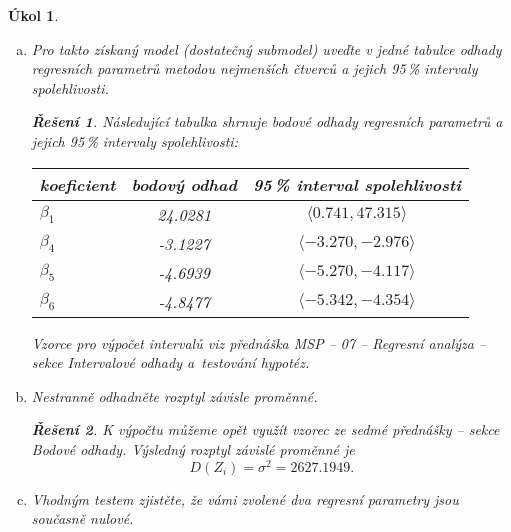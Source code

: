 \documentclass[11pt, a4paper]{article}
\theoremstyle{result}
\newtheorem*{result}{Řešení}
\newtheorem{task}{Úkol}
\begin{document}
\begin{task}
\begin{enumerate}[a)]
        \item Pro takto získaný model (dostatečný submodel) uveďte v jedné tabulce odhady regresních parametrů metodou nejmen\-ších čtverců a jejich 95\,\% intervaly spolehlivosti.

        \begin{result}
            Následující tabulka shrnuje bodové odhady regresních parametrů a jejich 95\,\% intervaly spolehlivosti:
            \begin{center}
                \begin{tabular}{ |l|c|c| }
                    \hline
                    \textbf{koeficient} & \textbf{bodový odhad} & \textbf{95\,\% interval spolehlivosti} \\
                    \hline
                    \boldmath$\beta_1$ & 24.0281 & $\langle 0.741, 47.315 \rangle$ \\
                    \hline
                    \boldmath$\beta_4$ & -3.1227 & $\langle -3.270, -2.976 \rangle$ \\
                    \hline
                    \boldmath$\beta_5$ & -4.6939 & $\langle -5.270, -4.117 \rangle$ \\
                    \hline
                    \boldmath$\beta_6$ & -4.8477 & $\langle -5.342, -4.354 \rangle$ \\
                    \hline
                \end{tabular}
            \end{center}

            Vzorce pro výpočet intervalů viz přednáška MSP -- 07 -- Regresní analýza -- sekce Intervalové odhady a~testování hypotéz.
        \end{result}
        
        \item Nestranně odhadněte rozptyl závisle proměnné.

        \begin{result}
            K výpočtu můžeme opět využít vzorec ze sedmé přednášky -- sekce Bodové odhady. Výsledný rozptyl závislé proměnné je
            $$D(Z_i) = \sigma^2 = 2627.1949.$$
        \end{result}
        
        \item Vhodným testem zjistěte, že vámi zvolené dva regresní parametry jsou současně nulové.


\end{enumerate}
\end{task}
\end{document}
